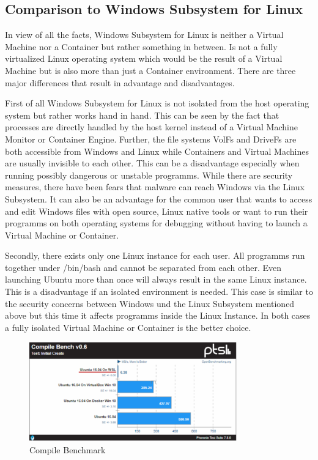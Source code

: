 \documentclass[utf8,biblatex, ngerman, english]{lni}
\begin{document}
\subsection{Comparison to Windows Subsystem for Linux}

In view of all the facts, Windows Subsystem for Linux is neither a Virtual Machine nor a Container but rather something in between. Is not a fully virtualized Linux operating system which would be the result of a Virtual Machine but is also more than just a Container environment. There are three major differences that result in advantage and disadvantages. 

First of all Windows Subsystem for Linux is not isolated from the host operating system but rather works hand in hand. This can be seen by the fact that processes are directly handled by the host kernel instead of a Virtual Machine Monitor or Container Engine. Further, the file systems VolFs and DriveFs are both accessible from Windows and Linux while Containers and Virtual Machines are usually invisible to each other. This can be a disadvantage especially when running possibly dangerous or unstable programms. While there are security measures, there have been fears that malware can reach Windows via the Linux Subsystem. \cite{Wh17} It can also be an advantage for the common user that wants to access and edit Windows files with open source, Linux native tools or want to run their programms on both operating systems for debugging without having to launch a Virtual Machine or Container.

Secondly, there exists only one Linux instance for each user. All programms run together under /bin/bash and cannot be separated from each other. Even launching Ubuntu more than once will always result in the same Linux instance.\cite{WSL16} This is a disadvantage if an isolated environment is needed. This case is similar to the security concerns between Windows und the Linux Subsystem mentioned above but this time it affects programms inside the Linux Instance. In both cases a fully isolated Virtual Machine or 
Container is the better choice.

\begin{figure}
  \centering
  \includegraphics[width=0.8\textwidth]{CompileSpeed.pdf}
  \caption{Compile Benchmark} %
  \label{img:container}
\end{figure}
\end{document}
